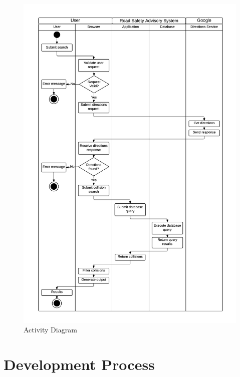 \documentclass[authoryearcitations]{UoYCSproject}
\begin{document}
\begin{figure}
	\center
	\includegraphics[scale=0.65]{activitydiagram}
	\caption{Activity Diagram}
	\label{fig:activitydiagram}
\end{figure}

\section{Development Process}
\end{document}

